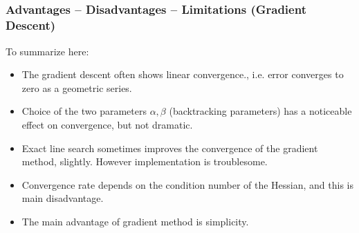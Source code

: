 \subsection{}
\begin{frame}
  \frametitle{Advantages -- Disadvantages -- Limitations (Gradient
    Descent)}
To summarize here:
  \begin{itemize}
  \item The gradient descent often shows linear convergence.,
i.e. error converges to zero as a geometric series.
\item Choice of the two parameters $\alpha, \beta$ (backtracking parameters) has
  a noticeable effect on convergence, but not dramatic.
\item Exact line search sometimes improves the convergence of the
  gradient method, slightly. However implementation is troublesome.
\item Convergence rate depends on the condition number of the Hessian,
  and this is main disadvantage.
\item The main advantage of gradient method is simplicity.
  \end{itemize}

\end{frame}


